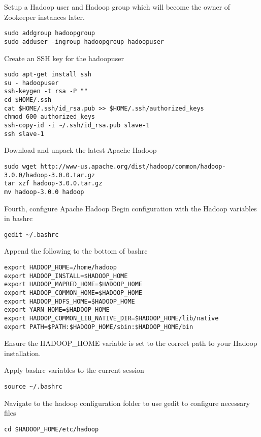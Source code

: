 Setup a Hadoop user and Hadoop group which will become the owner of
Zookeeper instances later.

\begin{lstlisting}
sudo addgroup hadoopgroup
sudo adduser -ingroup hadoopgroup hadoopuser
\end{lstlisting}

Create an SSH key for the hadoopuser

\begin{lstlisting}
sudo apt-get install ssh
su - hadoopuser
ssh-keygen -t rsa -P ""
cd $HOME/.ssh
cat $HOME/.ssh/id_rsa.pub >> $HOME/.ssh/authorized_keys
chmod 600 authorized_keys
ssh-copy-id -i ~/.ssh/id_rsa.pub slave-1
ssh slave-1
\end{lstlisting}

Download and unpack the latest Apache Hadoop

\begin{lstlisting}
sudo wget http://www-us.apache.org/dist/hadoop/common/hadoop-3.0.0/hadoop-3.0.0.tar.gz
tar xzf hadoop-3.0.0.tar.gz
mv hadoop-3.0.0 hadoop
\end{lstlisting}

Fourth, configure Apache Hadoop Begin configuration with the Hadoop
variables in bashrc

\begin{lstlisting}
gedit ~/.bashrc
\end{lstlisting}

Append the following to the bottom of bashrc

\begin{lstlisting}
export HADOOP_HOME=/home/hadoop
export HADOOP_INSTALL=$HADOOP_HOME
export HADOOP_MAPRED_HOME=$HADOOP_HOME
export HADOOP_COMMON_HOME=$HADOOP_HOME
export HADOOP_HDFS_HOME=$HADOOP_HOME
export YARN_HOME=$HADOOP_HOME
export HADOOP_COMMON_LIB_NATIVE_DIR=$HADOOP_HOME/lib/native
export PATH=$PATH:$HADOOP_HOME/sbin:$HADOOP_HOME/bin
\end{lstlisting}

Ensure the HADOOP\_HOME variable is set to the correct path to your
Hadoop installation.

Apply bashrc variables to the current session

\begin{lstlisting}
source ~/.bashrc
\end{lstlisting}

Navigate to the hadoop configuration folder to use gedit to configure
necessary files

\begin{lstlisting}
cd $HADOOP_HOME/etc/hadoop
\end{lstlisting}

